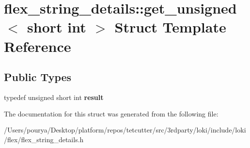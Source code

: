 \hypertarget{structflex__string__details_1_1get__unsigned_3_01short_01int_01_4}{}\section{flex\+\_\+string\+\_\+details\+:\+:get\+\_\+unsigned$<$ short int $>$ Struct Template Reference}
\label{structflex__string__details_1_1get__unsigned_3_01short_01int_01_4}
\subsection*{Public Types}
\begin{DoxyCompactItemize}
\item 
\hypertarget{structflex__string__details_1_1get__unsigned_3_01short_01int_01_4_a3132cb4f5bbb0bc1d63876417097cf51}{}typedef unsigned short int {\bfseries result}\label{structflex__string__details_1_1get__unsigned_3_01short_01int_01_4_a3132cb4f5bbb0bc1d63876417097cf51}

\end{DoxyCompactItemize}


The documentation for this struct was generated from the following file\+:\begin{DoxyCompactItemize}
\item 
/\+Users/pourya/\+Desktop/platform/repos/tetcutter/src/3rdparty/loki/include/loki/flex/flex\+\_\+string\+\_\+details.\+h\end{DoxyCompactItemize}
